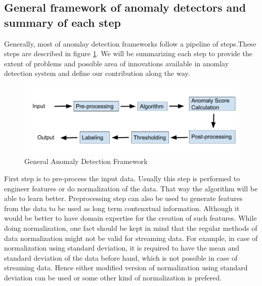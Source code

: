 \documentclass[12pt]{article}
\begin{document}
\subsection{General framework of anomaly detectors and summary of each step}
Generally, most of anomlay detection frameworks follow a pipeline of steps.These steps are described in figure \ref{generalAnomalyDetectionFrameWork}. We will be summarizing each step to provide the extent of problems and possible area of innovations available in anomlay detection system and define our contribution along the way.
\begin{figure}[H]
\centering
        \includegraphics[width=\textwidth]{images/generalAnomalyDetectionFrameWork.png}
    \caption{General Anomaly Detection Framework}
    \label{generalAnomalyDetectionFrameWork}
\end{figure}
First step is to pre-process the input data. Usually this step is performed to engineer features or do normalization of the data. That way the algorithm will be able to learn better.  Preprocessing step can also be used to generate features from the data to be used as long term contenxtual information. Although it would be better to have domain expertise for the creation of such features. While doing normalization, one fact should be kept in mind that the regular methods of data normalization might not be valid for streaming data. For example, in case of normalization using standard deviation, it is required to have the mean and standard deviation of the data before hand, which is not possible in case of streaming data. Hence either modified version of normalization using standard deviation can be used or some other kind of normalization is prefered.\\
\break
\end{document}
